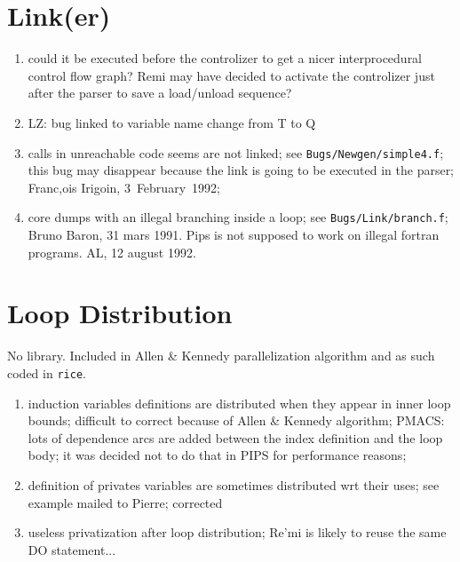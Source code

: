 \section{Link(er)}

\begin{enumerate}

  \item could  it be executed before the controlizer
to get a nicer interprocedural control flow graph? Remi may have decided
to activate the controlizer just after the parser to save a load/unload
sequence?

  \item LZ: bug linked to variable name change from T to Q

  \item calls in unreachable code seems are not linked; see
	\verb+Bugs/Newgen/simple4.f+; this bug may disappear because the
	link is going to be executed in the parser; 
	Franc,ois Irigoin, 3~February~1992;

  \item core dumps with an illegal branching inside a loop; see
	\verb+Bugs/Link/branch.f+; Bruno Baron, 31 mars 1991.
	Pips is not supposed to work on illegal fortran programs.
	AL, 12 august 1992.

\end{enumerate}

\section{Loop Distribution}

No library. Included in Allen \& Kennedy parallelization algorithm and
as such coded in \verb+rice+.

\begin{enumerate}

  \item induction variables definitions are distributed when they appear
	in inner loop bounds; difficult to correct because of Allen \&
	Kennedy algorithm; PMACS: lots of dependence arcs are added between
	the index definition and the loop body; it was decided not to do
	that in PIPS for performance reasons;

  \item definition of privates variables are sometimes distributed wrt
	their uses; see example mailed to Pierre; corrected

  \item useless privatization after loop distribution; Re'mi is likely to
	reuse the same DO statement...

\end{enumerate}

